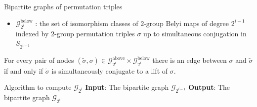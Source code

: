 \documentclass[handout,xcolor=dvipsnames]{beamer}
\theoremstyle{plain}
\newcommand{\wt}[1]{\widetilde{#1}}
\DeclareMathOperator{\Lifts}{Lifts}
\begin{document}
{\begin{frame}{Bipartite graphs of permutation triples}
\begin{itemize}
          $\mathscr{G}_{2^i}^\text{above}$ :
          the set of isomorphism classes of $2$-group Belyi maps
          of degree $2^i$
          indexed by $2$-group permutation triples
          $\wt{\sigma}$ up to simultaneous conjugation
          in $S_{2^i}$
        \item
          $\mathscr{G}_{2^i}^\text{below}$ :
          the set of isomorphism classes of $2$-group Belyi maps
          of degree $2^{i-1}$
          indexed by $2$-group permutation triples
          $\sigma$ up to simultaneous conjugation
          in $S_{2^{i-1}}$
      \end{itemize}
      \pause
      For every pair of nodes
      $(\wt{\sigma},\sigma)\in
      \mathscr{G}_{2^i}^\text{above}\times
      \mathscr{G}_{2^i}^\text{below}$
      there is an edge between
      $\sigma$ and $\wt{\sigma}$
      if and only if $\wt{\sigma}$ is
      simultaneously conjugate to a lift of
      $\sigma$.
    \end{frame}
    \begin{frame}{Algorithm to compute $\mathscr{G}_{2^i}$}
      \textbf{Input}:
      The bipartite graph $\mathscr{G}_{2^{i-1}}$
      \newline
      \textbf{Output}:
      The bipartite graph $\mathscr{G}_{2^{i}}$
      \pause\par
\end{frame}}
\end{document}
